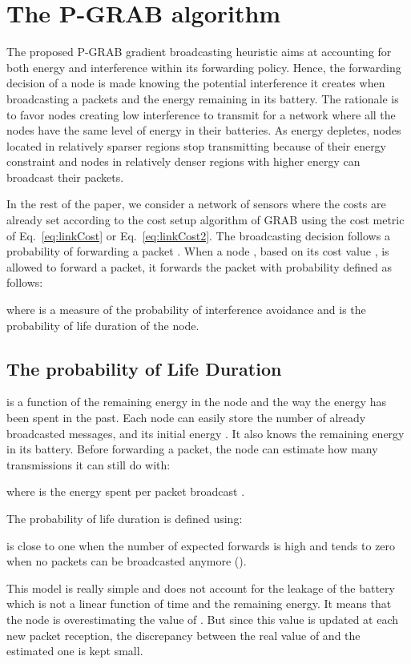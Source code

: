 \documentclass[journal, peerreview, onecolumn, draftcls]{IEEEtran}
\begin{document}
\section{The P-GRAB algorithm}\label{sec:PGRAB}

The proposed P-GRAB gradient broadcasting heuristic aims at accounting for both energy and interference within its forwarding policy. Hence, the forwarding decision of a node is made knowing the potential interference it creates when broadcasting a packets and the energy remaining in its battery. The rationale is to favor nodes creating low interference to transmit for a network where all the nodes have the same level of energy in their batteries. As energy depletes, nodes located in relatively sparser regions stop transmitting because of their energy constraint and nodes in relatively denser regions with higher energy can broadcast their packets.

In the rest of the paper, we consider a network of  sensors where the costs are already set according to the cost setup algorithm of GRAB using the cost metric of Eq.~\ref{eq:linkCost} or Eq.~\ref{eq:linkCost2}. The broadcasting decision follows a probability of forwarding a packet . When a node , based on its cost value , is allowed to forward a packet, it forwards the packet with probability  defined as follows:

\noindent where  is a measure of the probability of interference avoidance and  is the probability of life duration of the node.

\subsection{The probability of Life Duration}

 is a function of the remaining energy in the node and the way the energy has been spent in the past. Each node can easily store the number  of already broadcasted messages, and its initial energy . It also knows the remaining energy  in its battery. Before forwarding a packet, the node can estimate how many transmissions  it can still do with:

\noindent where  is the energy spent per packet broadcast .

The probability of life duration  is defined using:

 is close to one when the number of expected forwards  is high and tends to zero when no packets can be broadcasted anymore ().

This model is really simple and does not account for the leakage of the battery which is not a linear function of time and the remaining energy. It means that the node is overestimating the value of . But since this value is updated at each new packet reception, the discrepancy between the real value of  and the estimated one is kept small.
\end{document}
